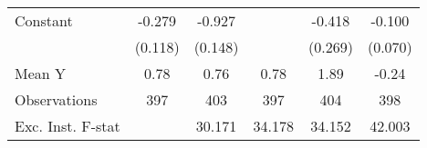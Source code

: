 {\begin{tabular}{l*{5}{c}}
\addlinespace
Constant            &      -0.279\sym{**} &      -0.927\sym{***}&                     &      -0.418         &      -0.100         \\
                    &     (0.118)         &     (0.148)         &                     &     (0.269)         &     (0.070)         \\
\midrule
Mean Y              &        0.78         &        0.76         &        0.78         &        1.89         &       -0.24         \\
Observations        &         397         &         403         &         397         &         404         &         398         \\
Exc. Inst. F-stat   &                     &      30.171         &      34.178         &      34.152         &      42.003         \\
\bottomrule
\end{tabular}
}
